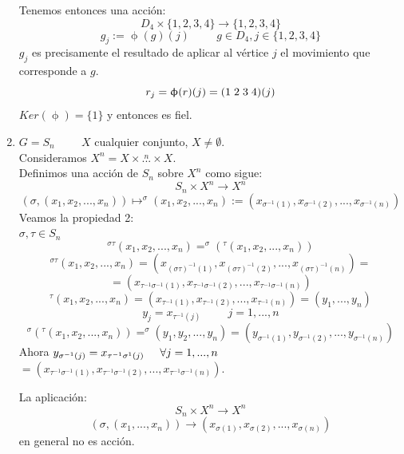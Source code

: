 \documentclass[11pt,a4paper]{article}
\begin{document}
\begin{enumerate}[label = \arabic*)]
Tenemos entonces una acción:
$$D_{4} \times \{1, 2, 3, 4\} \to \{1, 2, 3, 4\}$$
$$g_{j} := \upphi(g)(j) \hspace{1cm} g \in D_{4}, j \in \{1, 2, 3, 4\}$$
$g_{j}$ es precisamente el resultado de aplicar al vértice $j$ el movimiento que corresponde a $g$.
$$r_{j} = \upphi(r)(j) = (1 \hspace{0.1cm} 2 \hspace{0.1cm} 3 \hspace{0.1cm} 4) (j)$$
$Ker(\upphi) = \{1\}$ y entonces es fiel.
\item $G = S_{n} \hspace{1cm} X$ cualquier conjunto, $X \neq \emptyset$. \\
Consideramos $X^{n} = X \times \overset{n}{...} \times X$. \\
Definimos una acción de $S_{n}$ sobre $X^{n}$ como sigue:
$$S_{n} \times X^{n} \to X^{n}$$
$$(\sigma, (x_{1}, x_{2}, ..., x_{n})) \mapsto ^{\sigma} (x_{1}, x_{2}, ..., x_{n}) := (x_{\sigma^{-1}(1)}, x_{\sigma^{-1}(2)}, ..., x_{\sigma^{-1}(n)})$$
Veamos la propiedad 2: \\
$\sigma, \tau \in S_{n}$
$$^{\sigma \tau}(x_{1}, x_{2}, ..., x_{n}) = ^{\sigma}(^{\tau}(x_{1}, x_{2}, ..., x_{n}))$$
$$^{\sigma \tau}(x_{1}, x_{2}, ..., x_{n}) = (x_{(\sigma \tau)^{-1}(1)}, x_{(\sigma \tau)^{-1}(2)}, ..., x_{(\sigma \tau)^{-1}(n)}) =$$ $$= (x_{\tau^{-1}\sigma^{-1}(1)}, x_{\tau^{-1}\sigma^{-1}(2)}, ..., x_{\tau^{-1}\sigma^{-1}(n)})$$
$$^{\tau}(x_{1}, x_{2}, ..., x_{n}) = (x_{\tau^{-1}(1)}, x_{\tau^{-1}(2)}, ..., x_{\tau^{-1}(n)}) = (y_{1}, ..., y_{n})$$
$$y_{j} = x_{\tau^{-1}(j)} \hspace{1cm} j = 1, ..., n$$
$$^{\sigma}(^{\tau}(x_{1}, x_{2}, ..., x_{n})) = ^{\sigma}(y_{1}, y_{2}, ..., y_{n}) = (y_{\sigma^{-1}(1)}, y_{\sigma^{-1}(2)}, ..., y_{\sigma^{-1}(n)})$$
Ahora $y_{\sigma^{-1}(j)} = x_{\tau^{-1}\sigma^{1}(j)} \hspace{0.5cm} \forall j = 1, ..., n$ \\
$= (x_{\tau^{-1}\sigma^{-1}(1)}, x_{\tau^{-1}\sigma^{-1}(2)}, ..., x_{\tau^{-1}\sigma^{-1}(n)})$.

La aplicación:
$$S_{n} \times X^{n} \to X^{n}$$
$$(\sigma, (x_{1}, ..., x_{n})) \to (x_{\sigma(1)}, x_{\sigma(2)}, ..., x_{\sigma(n)})$$
en general no es acción.



\end{enumerate}
\end{document}
